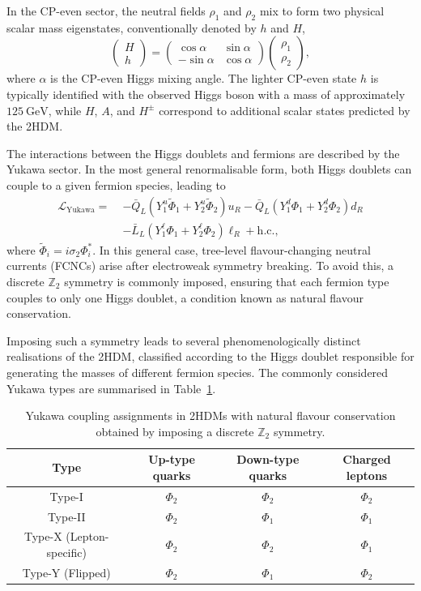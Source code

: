 In the CP-even sector, the neutral fields $\rho_1$ and $\rho_2$
mix to form two physical scalar mass eigenstates, conventionally
denoted by $h$ and $H$,
\[
\begin{pmatrix}
H \\
h
\end{pmatrix}
=
\begin{pmatrix}
\cos\alpha & \sin\alpha \\
-\sin\alpha & \cos\alpha
\end{pmatrix}
\begin{pmatrix}
\rho_1 \\
\rho_2
\end{pmatrix},
\]
where $\alpha$ is the CP-even Higgs mixing angle.
The lighter CP-even state $h$ is typically identified with the
observed Higgs boson with a mass of approximately $125~\mathrm{GeV}$, while $H$, $A$, and
$H^\pm$ correspond to additional scalar states predicted by the
2HDM.

The interactions between the Higgs doublets and fermions are
described by the Yukawa sector.
In the most general renormalisable form, both Higgs doublets can
couple to a given fermion species, leading to
\[
\begin{aligned}
\mathcal{L}_\text{Yukawa} =\;&
- \bar{Q}_L \left( Y_1^u \tilde{\Phi}_1 + Y_2^u \tilde{\Phi}_2 \right) u_R
- \bar{Q}_L \left( Y_1^d \Phi_1 + Y_2^d \Phi_2 \right) d_R \\
&- \bar{L}_L \left( Y_1^\ell \Phi_1 + Y_2^\ell \Phi_2 \right) \ell_R
+ \text{h.c.},
\end{aligned}
\]
where $\tilde{\Phi}_i = i \sigma_2 \Phi_i^\ast$.
In this general case, tree-level flavour-changing neutral currents
(FCNCs) arise after electroweak symmetry breaking.
To avoid this, a discrete $\mathbb{Z}_2$ symmetry is commonly
imposed, ensuring that each fermion type couples to only one
Higgs doublet, a condition known as natural flavour conservation.

Imposing such a symmetry leads to several phenomenologically
distinct realisations of the 2HDM, classified according to the
Higgs doublet responsible for generating the masses of different
fermion species.
The commonly considered Yukawa types are summarised in
Table~\ref{tab:2hdm_yukawa_types}.

\begin{table}[htbp]
\centering
\caption{Yukawa coupling assignments in 2HDMs with natural flavour
conservation obtained by imposing a discrete $\mathbb{Z}_2$ symmetry.}
\begin{tabular}{c|ccc}
\hline
Type & Up-type quarks & Down-type quarks & Charged leptons \\
\hline
Type-I  & $\Phi_2$ & $\Phi_2$ & $\Phi_2$ \\
Type-II & $\Phi_2$ & $\Phi_1$ & $\Phi_1$ \\
Type-X (Lepton-specific) & $\Phi_2$ & $\Phi_2$ & $\Phi_1$ \\
Type-Y (Flipped) & $\Phi_2$ & $\Phi_1$ & $\Phi_2$ \\
\hline
\end{tabular}
\label{tab:2hdm_yukawa_types}
\end{table}

